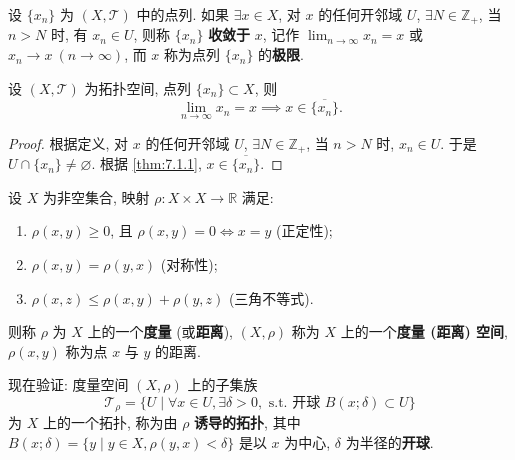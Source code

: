 \begin{definition}\label{def:7.1.3}
设 $\{x_n\}$ 为 $(X, \mathcal{T})$ 中的点列. 如果 $\exists x \in X$, 对 $x$ 的任何开邻域 $U$, $\exists N \in \mathbb{Z}_+$, 当 $n > N$ 时, 有 $x_n \in U$, 则称 $\{x_n\}$ \textbf{收敛于} $x$, 记作 $\lim_{n \to \infty} x_n = x$ 或 $x_n \to x\ (n \to \infty)$, 而 $x$ 称为点列 $\{x_n\}$ 的\textbf{极限}.
\end{definition}

\begin{theorem}\label{thm:7.1.5}
设 $(X, \mathcal{T})$ 为拓扑空间, 点列 $\{x_n\} \subset X$, 则
\[
  \lim_{n \to \infty} x_n = x \implies x \in \overline{\{x_n\}}.
\]
\end{theorem}

\begin{proof}
根据定义, 对 $x$ 的任何开邻域 $U$, $\exists N \in \mathbb{Z}_+$, 当 $n > N$ 时, $x_n \in U$. 于是 $U \cap \{x_n\} \neq \varnothing$. 根据 \cref{thm:7.1.1}, $x \in \overline{\{x_n\}}$. \qedhere
\end{proof}

\begin{definition}\label{def:7.1.4}
设 $X$ 为非空集合, 映射 $\rho: X \times X \to \mathbb{R}$ 满足:
\begin{enumerate}
  \item $\rho(x, y) \geqslant 0$, 且 $\rho(x, y) = 0 \iff x = y$ (正定性);
  \item $\rho(x, y) = \rho(y, x)$ (对称性);
  \item $\rho(x, z) \leqslant \rho(x, y) + \rho(y, z)$ (三角不等式).
\end{enumerate}
则称 $\rho$ 为 $X$ 上的一个\textbf{度量} (或\textbf{距离}), $(X, \rho)$ 称为 $X$ 上的一个\textbf{度量 (距离) 空间}, $\rho(x, y)$ 称为点 $x$ 与 $y$ 的距离.

现在验证: 度量空间 $(X, \rho)$ 上的子集族
\[
  \mathcal{T}_\rho = \{U \mid \forall x \in U, \exists \delta > 0,\text{ s.t. 开球 } B(x; \delta) \subset U\}
\]
为 $X$ 上的一个拓扑, 称为由 $\rho$ \textbf{诱导的拓扑}, 其中 $B(x; \delta) = \{y \mid y \in X, \rho(y, x) < \delta\}$ 是以 $x$ 为中心, $\delta$ 为半径的\textbf{开球}.
\end{definition}

